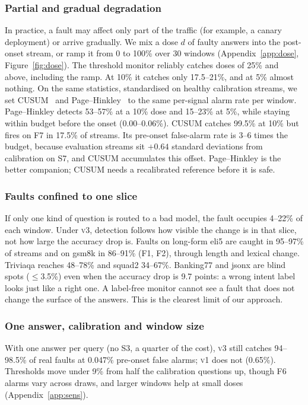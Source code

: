 \documentclass{article}
\newcommand{\vone}{\textsc{v1}}
\newcommand{\vthree}{\textsc{v3}}
\begin{document}
\subsubsection{Partial and gradual degradation}
\label{sec:seq}
In practice, a fault may affect only part of the traffic (for example, a
canary deployment) or arrive gradually. We mix a dose $d$ of faulty answers into
the post-onset stream, or ramp it from 0 to 100\% over 30 windows
(Appendix~\ref{app:dose}, Figure~\ref{fig:dose}). The threshold monitor reliably catches doses of 25\% and
above, including the ramp. At 10\% it catches only 17.5--21\%, and at 5\% almost
nothing. On the same statistics, standardised on healthy calibration streams, we
set CUSUM~\citep{page1954continuous} and
Page--Hinkley~\citep{hinkley1971inference} to the same per-signal alarm rate per
window. Page--Hinkley detects 53--57\% at a 10\% dose and 15--23\% at 5\%, while
staying within budget before the onset (0.00--0.06\%). CUSUM catches 99.5\% at 10\%
but fires on F7 in 17.5\% of streams. Its pre-onset false-alarm rate is 3--6 times
the budget, because evaluation streams sit $+0.64$ standard deviations from
calibration on S7, and CUSUM accumulates this offset. Page--Hinkley is the better
companion; CUSUM needs a recalibrated reference before it is safe.



\subsubsection{Faults confined to one slice}
\label{sec:slice}
If only one kind of question is routed to a bad model, the fault occupies 4--22\%
of each window. Under \vthree{}, detection follows how visible the change is in
that slice, not how large the accuracy drop is. Faults on long-form eli5 are
caught in 95--97\% of streams and on gsm8k in 86--91\% (F1, F2), through length and
lexical change. Triviaqa reaches 48--78\% and squad2 34--67\%. Banking77 and
\textsf{jsonx} are blind spots ($\le$3.5\%) even when the accuracy drop is 9.7
points: a wrong intent label looks just like a right one. A label-free monitor
cannot see a fault that does not change the surface of the answers. This is the
clearest limit of our approach.

\subsubsection{One answer, calibration and window size}
\label{sec:oneanswer}
With one answer per query (no S3, a quarter of the cost), \vthree{} still catches
94--98.5\% of real faults at 0.047\% pre-onset false alarms; \vone{} does not
(0.65\%). Thresholds move under 9\% from half the calibration questions up, though F6
alarms vary across draws, and larger windows help at small doses (Appendix~\ref{app:sens}).
\end{document}
